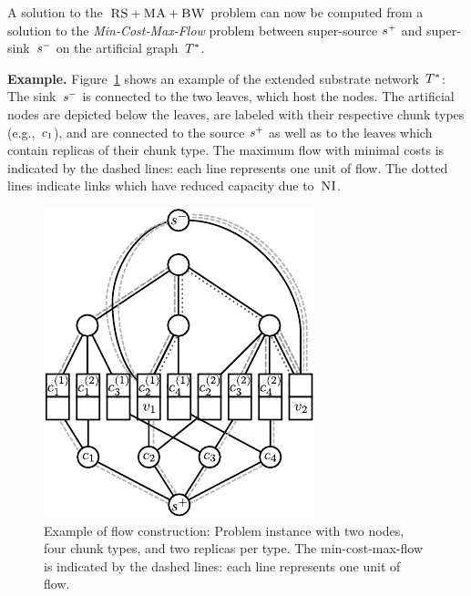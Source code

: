 A solution to the~$\textsc{RS}+\textsc{MA}+\textsc{BW}$ problem can now be computed
from a solution to the \emph{Min-Cost-Max-Flow} problem between super-source
$s^{+}$ and
super-sink~$s^{-}$ on the artificial graph~$T^*$.

\textbf{Example.} Figure~\ref{fig:flow_construction} shows an example of the extended substrate
network~$T^*$: The sink~$s^{-}$ is connected to the two leaves, which host the
nodes. The artificial nodes are depicted below the leaves, are labeled with
their respective chunk types (e.g.,~$c_1$), and are connected to the source
$s^{+}$ as well as to the leaves which contain replicas of their chunk type.
The
maximum flow with minimal costs is indicated by the dashed lines: each line
represents one unit of flow. The dotted lines indicate links which have reduced
capacity due to~$\textsc{NI}$.

\begin{figure}
\centering
\includegraphics[width=0.45\columnwidth]{figs/static-mapping/flow_ma_cv}
\caption{Example of flow construction: Problem instance with two nodes, four chunk
types, and two replicas per type. The min-cost-max-flow
is indicated by the dashed lines: each line represents one unit of flow.
}
\vspace{-1em}
\label{fig:flow_construction}
\end{figure}

